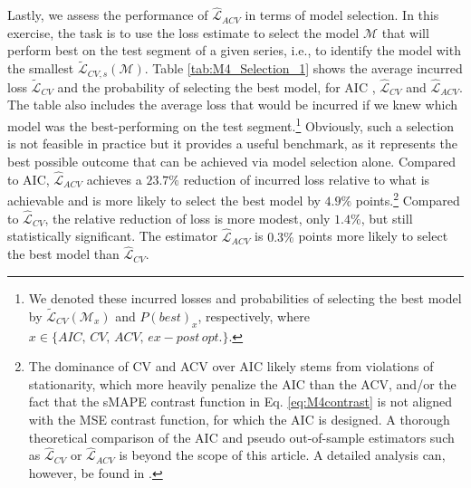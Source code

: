 \documentclass[11pt,dvipsnames]{article}
\begin{document}
Lastly, we assess the performance of $ \widehat{\mathcal{L}}_{ACV} $ in terms of model selection. In this exercise, the task is to use the loss estimate to select the model $ \mathcal{M} $ that will perform best on the test segment of a given series, i.e., to identify the model with the smallest $ \widetilde{\mathcal{L}}_{CV,s}(\mathcal{M}) $. Table \ref{tab:M4_Selection_1} shows the average incurred loss $ \widetilde{\mathcal{L}}_{CV} $ and the probability of selecting the best model, for AIC \citep{akaikeInformationTheoryExtension1998},  $ \widehat{\mathcal{L}}_{CV} $ and $ \widehat{\mathcal{L}}_{ACV} $. The table also includes the average loss that would be incurred if we knew which model was the best-performing on the test segment.\footnote{We denoted these incurred losses and probabilities of selecting the best model by $ \widetilde{\mathcal{L}}_{CV}(\mathcal{M}_{x}) $ and $ P(best)_{x} $, respectively, where $ x \in \lbrace AIC,\, CV,\, ACV,\, ex-post\,opt. \rbrace $.} Obviously, such a selection is not feasible in practice but it provides a useful benchmark, as it represents the best possible outcome that can be achieved via model selection alone. Compared to AIC, $ \widehat{\mathcal{L}}_{ACV} $ achieves a $ 23.7\% $ reduction of incurred loss relative to what is achievable and is more likely to select the best model by $ 4.9\% $ points.\footnote{The dominance of CV and ACV over AIC likely stems from violations of stationarity, which more heavily penalize the AIC than the ACV, and/or the fact that the sMAPE contrast function in Eq. \ref{eq:M4contrast} is not aligned with the MSE contrast function, for which the AIC is designed. A thorough theoretical comparison of the AIC and pseudo out-of-sample estimators such as $ \widehat{\mathcal{L}}_{CV}$ or $ \widehat{\mathcal{L}}_{ACV}$ is beyond the scope of this article. A detailed analysis can, however, be found in \citet{inoueSelectionForecastingModels2006}.} Compared to $ \widehat{\mathcal{L}}_{CV} $, the relative reduction of loss is more modest, only $ 1.4\% $, but still statistically significant. The estimator $ \widehat{\mathcal{L}}_{ACV} $ is $ 0.3\% $ points more likely to select the best model than $ \widehat{\mathcal{L}}_{CV} $.
\end{document}

